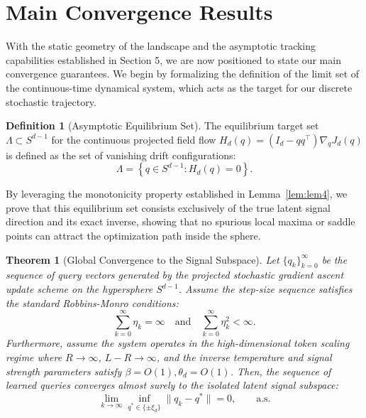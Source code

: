 \documentclass[11pt,a4paper]{article}
\newtheorem{theorem}{Theorem}
\theoremstyle{definition}
\newtheorem{definition}{Definition}
\begin{document}
\section{Main Convergence Results}

With the static geometry of the landscape and the asymptotic tracking capabilities established in Section 5, we are now positioned to state our main convergence guarantees. We begin by formalizing the definition of the limit set of the continuous-time dynamical system, which acts as the target for our discrete stochastic trajectory.

\begin{definition}[Asymptotic Equilibrium Set] \label{def:equilibrium_set}
The equilibrium target set $\Lambda \subset S^{d-1}$ for the continuous projected field flow $H_d(q) = (I_d - qq^\top)\nabla_q J_d(q)$ is defined as the set of vanishing drift configurations:
\begin{equation}
    \Lambda = \left\{ q \in S^{d-1} : H_d(q) = 0 \right\}.
\end{equation}
\end{definition}

\noindent By leveraging the monotonicity property established in Lemma~\ref{lem:lem4}, we prove that this equilibrium set consists exclusively of the true latent signal direction and its exact inverse, showing that no spurious local maxima or saddle points can attract the optimization path inside the sphere.

\begin{theorem}[Global Convergence to the Signal Subspace] \label{thm:main}
Let $\{q_k\}_{k=0}^{\infty}$ be the sequence of query vectors generated by the projected stochastic gradient ascent update scheme on the hypersphere $S^{d-1}$. Assume the step-size sequence satisfies the standard Robbins-Monro conditions:
\begin{equation}
    \sum_{k=0}^{\infty} \eta_k = \infty \quad \text{and} \quad \sum_{k=0}^{\infty} \eta_k^2 < \infty.
\end{equation}
Furthermore, assume the system operates in the high-dimensional token scaling regime where $R \to \infty$, $L-R \to \infty$, and the inverse temperature and signal strength parameters satisfy $\beta =O(1), \theta_d = O(1)$. Then, the sequence of learned queries converges almost surely to the isolated latent signal subspace:
\begin{equation}
    \lim_{k \to \infty} \inf_{q^* \in \{\pm \xi_d\}} \|q_k - q^*\| = 0, \qquad \text{a.s.}
\end{equation}
\end{theorem}
\end{document}
